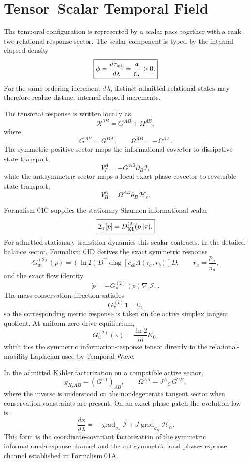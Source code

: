 \chapter{Tensor--Scalar Temporal Field}
The temporal configuration is represented by a scalar pace together with a rank-two relational response sector. The scalar component is typed by the internal elapsed density
\[
\boxed{
\phi
=\frac{d\tau_{\rm int}}{d\lambda}
=\frac{\mathfrak a}{\mathfrak a_\star}>0.
}
\]
For the same ordering increment \(d\lambda\), distinct admitted relational states may therefore realize distinct internal elapsed increments.

The tensorial response is written locally as
\[
\boxed{
\mathcal R^{AB}=G^{AB}+\Omega^{AB},
}
\]
where
\[
G^{AB}=G^{BA},
\qquad
\Omega^{AB}=-\Omega^{BA}.
\]
The symmetric positive sector maps the informational covector to dissipative state transport,
\[
V_I^A=-G^{AB}\partial_B\mathcal I,
\]
while the antisymmetric sector maps a local exact phase covector to reversible state transport,
\[
V_H^A=\Omega^{AB}\partial_B\mathcal H_\alpha.
\]

Formalism 01C supplies the stationary Shannon informational scalar
\[
\boxed{
\mathcal I_\pi[p]=D_{\rm KL}^{(2)}(p\|\pi).
}
\]
For admitted stationary transition dynamics this scalar contracts. In the detailed-balance sector, Formalism 01D derives the exact symmetric response
\[
\boxed{
G^{(2)}_\pi(p)
=(\ln2)D^\top\operatorname{diag}[c_{ab}\Lambda(r_a,r_b)]D,
\qquad
r_a=\frac{p_a}{\pi_a},
}
\]
and the exact flow identity
\[
\boxed{
\dot p=-G^{(2)}_\pi(p)\nabla_p\mathcal I_\pi.
}
\]
The mass-conservation direction satisfies
\[
G^{(2)}_\pi\mathbf1=0,
\]
so the corresponding metric response is taken on the active simplex tangent quotient. At uniform zero-drive equilibrium,
\[
\boxed{
G^{(2)}_u(u)=\frac{\ln2}{m}K_0,
}
\]
which ties the symmetric information-response tensor directly to the relational-mobility Laplacian used by Temporal Wave.

In the admitted Kähler factorization on a compatible active sector,
\[
g_{K,AB}=(G^{-1})_{AB},
\qquad
\Omega^{AB}=J^A{}_{C}G^{CB},
\]
where the inverse is understood on the nondegenerate tangent sector when conservation constraints are present. On an exact phase patch the evolution law is
\[
\boxed{
\frac{dx}{d\lambda}
=-\operatorname{grad}_{g_K}\mathcal I
+J\operatorname{grad}_{g_K}\mathcal H_\alpha.
}
\]
This form is the coordinate-covariant factorization of the symmetric informational-response channel and the antisymmetric local phase-response channel established in Formalism 01A.

